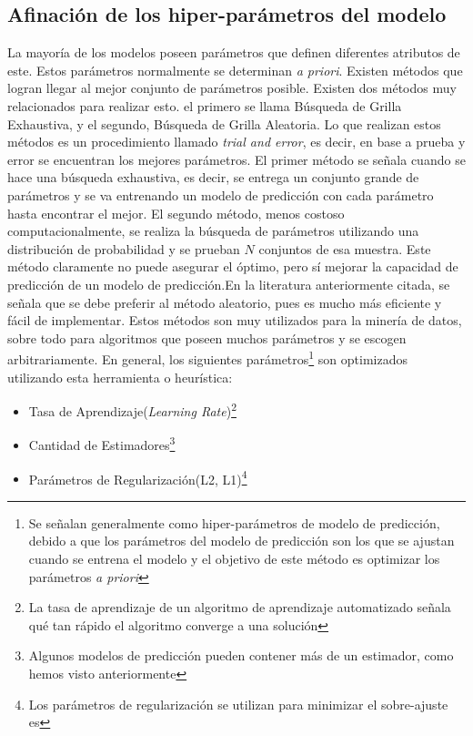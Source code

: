 
\subsection{Afinación de los hiper-parámetros del modelo}
La mayoría de los modelos poseen parámetros que definen diferentes atributos de este. Estos parámetros normalmente se determinan \textit{a priori}. Existen métodos que logran llegar al mejor conjunto de parámetros posible. Existen dos métodos muy relacionados para realizar esto. el primero se llama Búsqueda de Grilla Exhaustiva, y el segundo, Búsqueda de Grilla Aleatoria\citep{Bergstra}. Lo que realizan estos métodos es un procedimiento llamado \textit{trial and error}, es decir, en base a prueba y error se encuentran los mejores parámetros. El primer método se señala cuando se hace una búsqueda exhaustiva, es decir, se entrega un conjunto grande de parámetros y se va entrenando un modelo de predicción con cada parámetro hasta encontrar el mejor. El segundo método, menos costoso computacionalmente, se realiza la búsqueda de parámetros utilizando una distribución de probabilidad y se prueban $N$ conjuntos de esa muestra. Este método claramente no puede asegurar el óptimo, pero sí mejorar la capacidad de predicción de un modelo de predicción.En la literatura anteriormente citada, se señala que se debe preferir al método aleatorio, pues es mucho más eficiente y fácil de implementar.
Estos métodos son muy utilizados para la minería de datos, sobre todo para algoritmos que poseen muchos parámetros y se escogen arbitrariamente.
En general, los siguientes parámetros\footnote{Se señalan generalmente como hiper-parámetros de modelo de predicción, debido a que los parámetros del modelo de predicción son los que se ajustan cuando se entrena el modelo y el objetivo de este método es optimizar los parámetros \textit{a priori}} son optimizados utilizando esta herramienta o heurística:
\begin{itemize}
\item Tasa de Aprendizaje(\textit{Learning Rate})\footnote{La tasa de aprendizaje de un algoritmo de aprendizaje automatizado señala qué tan rápido el algoritmo converge a una solución}
\item Cantidad de Estimadores\footnote{Algunos modelos de predicción pueden contener más de un estimador, como hemos visto anteriormente}
\item Parámetros de Regularización(L2, L1)\footnote{Los parámetros de regularización se utilizan para minimizar el sobre-ajuste es}
\end{itemize}
